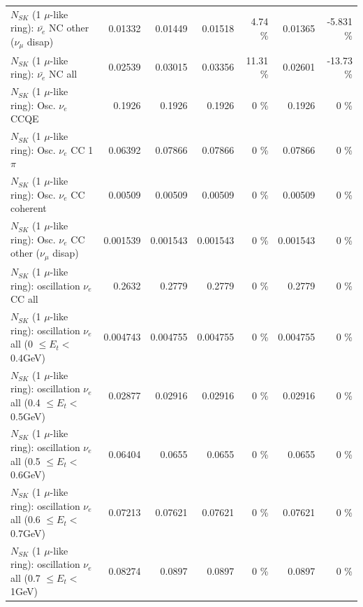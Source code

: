 \begin{table}
\begin{tabular}{| l | r | r | r  r | r  r |}
          $N_{SK}$ (1 $\mu$-like ring): $\bar{\nu_e}$ NC other ($\nu_\mu$ disap) &         0.01332 &         0.01449 &         0.01518 &     4.74 \%  &         0.01365 &   -5.831 \%  \\ 
                            $N_{SK}$ (1 $\mu$-like ring): $\bar{\nu_{e}}$ NC all &         0.02539 &         0.03015 &         0.03356 &    11.31 \%  &         0.02601 &   -13.73 \%  \\ 
\hline
\hline
\hline
                                 $N_{SK}$ (1 $\mu$-like ring): Osc. $\nu_e$ CCQE &          0.1926 &          0.1926 &          0.1926 &        0 \%  &          0.1926 &        0 \%  \\ 
                            $N_{SK}$ (1 $\mu$-like ring): Osc. $\nu_e$ CC 1$\pi$ &         0.06392 &         0.07866 &         0.07866 &        0 \%  &         0.07866 &        0 \%  \\ 
                          $N_{SK}$ (1 $\mu$-like ring): Osc. $\nu_e$ CC coherent &         0.00509 &         0.00509 &         0.00509 &        0 \%  &         0.00509 &        0 \%  \\ 
           $N_{SK}$ (1 $\mu$-like ring): Osc. $\nu_e$ CC other ($\nu_\mu$ disap) &        0.001539 &        0.001543 &        0.001543 &        0 \%  &        0.001543 &        0 \%  \\ 
                        $N_{SK}$ (1 $\mu$-like ring): oscillation $\nu_e$ CC all &          0.2632 &          0.2779 &          0.2779 &        0 \%  &          0.2779 &        0 \%  \\ 
\hline
$N_{SK}$ (1 $\mu$-like ring): oscillation $\nu_{e}$ all (0 $\leq E_{t} <$ 0.4GeV) &        0.004743 &        0.004755 &        0.004755 &        0 \%  &        0.004755 &        0 \%  \\ 
$N_{SK}$ (1 $\mu$-like ring): oscillation $\nu_{e}$ all (0.4 $\leq E_{t} <$ 0.5GeV) &         0.02877 &         0.02916 &         0.02916 &        0 \%  &         0.02916 &        0 \%  \\ 
$N_{SK}$ (1 $\mu$-like ring): oscillation $\nu_{e}$ all (0.5 $\leq E_{t} <$ 0.6GeV) &         0.06404 &          0.0655 &          0.0655 &        0 \%  &          0.0655 &        0 \%  \\ 
$N_{SK}$ (1 $\mu$-like ring): oscillation $\nu_{e}$ all (0.6 $\leq E_{t} <$ 0.7GeV) &         0.07213 &         0.07621 &         0.07621 &        0 \%  &         0.07621 &        0 \%  \\ 
$N_{SK}$ (1 $\mu$-like ring): oscillation $\nu_{e}$ all (0.7 $\leq E_{t} <$ 1GeV) &         0.08274 &          0.0897 &          0.0897 &        0 \%  &          0.0897 &        0 \%  \\ 

\end{tabular}
\end{table}
